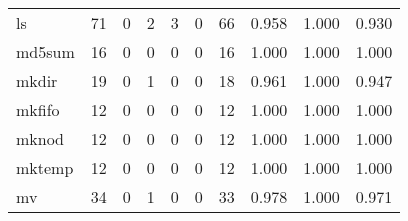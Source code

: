 \begin{longtable}{lp{1.3cm}p{1.3cm}p{1.3cm}p{1.3cm}p{1.3cm}p{1.3cm}p{1.3cm}p{1.3cm}p{1.3cm}}
ls        &                     71 &                                             0 &                                            2 &                                           3 &                                            0 &                                         66 &                                0.958 &                                  1.000 &                                0.930 \\
md5sum    &                     16 &                                             0 &                                            0 &                                           0 &                                            0 &                                         16 &                                1.000 &                                  1.000 &                                1.000 \\
mkdir     &                     19 &                                             0 &                                            1 &                                           0 &                                            0 &                                         18 &                                0.961 &                                  1.000 &                                0.947 \\
mkfifo    &                     12 &                                             0 &                                            0 &                                           0 &                                            0 &                                         12 &                                1.000 &                                  1.000 &                                1.000 \\
mknod     &                     12 &                                             0 &                                            0 &                                           0 &                                            0 &                                         12 &                                1.000 &                                  1.000 &                                1.000 \\
mktemp    &                     12 &                                             0 &                                            0 &                                           0 &                                            0 &                                         12 &                                1.000 &                                  1.000 &                                1.000 \\
mv        &                     34 &                                             0 &                                            1 &                                           0 &                                            0 &                                         33 &                                0.978 &                                  1.000 &                                0.971 \\

\end{longtable}
